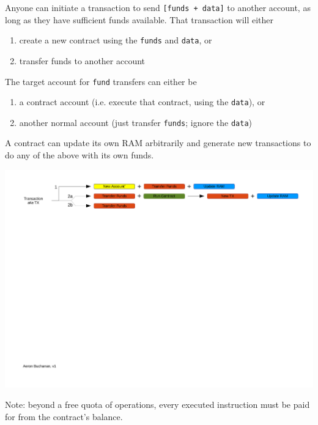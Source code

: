 \documentclass[10pt,a4paper]{article}
\begin{document}
Anyone can initiate a transaction to send {\tt [funds + data]} to another account, as long as they have sufficient funds available. That transaction will either 

\begin{enumerate}[\hspace{1cm}1.] \itemsep=0pt
\item create a new contract using the {\tt funds} and {\tt data}, or 
\item transfer funds to another account
\end{enumerate} 
 
The target account for {\tt fund} transfers can either be
 
\begin{enumerate}[\hspace{1cm}a)] \itemsep=0pt
\item a contract account (i.e. execute that contract, using the {\tt data}), or
\item another normal account (just transfer {\tt funds}; ignore the {\tt data})
\end{enumerate}
 
A contract can update its own RAM arbitrarily and generate new transactions to do any of the above with its own funds.

\begin{center}
\includegraphics[trim=1cm 17cm 1cm 1cm, clip, width=15cm]{Diagrams/FlowDiagramEthereumTXTypes.pdf}
\end{center}

Note: beyond a free quota of operations, every executed instruction must be paid for from the contract's balance.
\end{document}

